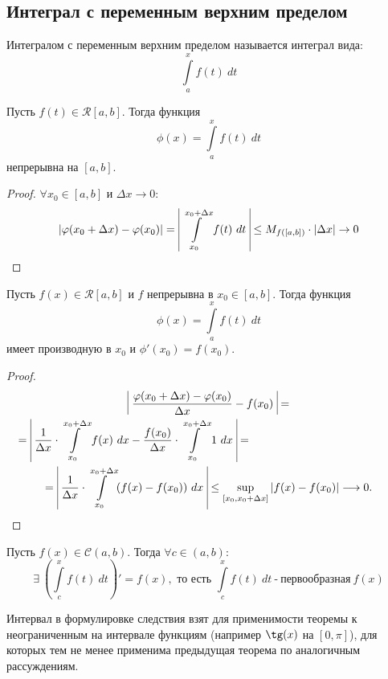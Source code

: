 \subsection{Интеграл с переменным верхним пределом}
\begin{definition}
    Интегралом с переменным верхним пределом называется интеграл вида:
    \[\int\limits_{a}^{x} f(t)\ dt\]
\end{definition} 
\begin{theorem}
    Пусть $f(t)\in \mathcal{R}[a, b]$. Тогда функция
    \[\phi(x) = \int\limits_{a}^{x} f(t)\ dt\]
    непрерывна на $[a, b]$.
\end{theorem}
\begin{proof} 
    $\forall x_0\in [a,b]$ и $\Delta x\to 0:$
    \[|\phi(x_0 + \Delta x) - \phi(x_0)| =\ \vline\int\limits_{x_0}^{x_0 + \Delta x} f(t)\ dt\ \vline \leq M_{f([a, b])}\cdot |\Delta x| \rightarrow 0\]
\end{proof}
\begin{theorem}
    Пусть $f(x)\in \mathcal{R}[a, b]$ и $f$ непрерывна в $x_0 \in [a, b]$. Тогда функция
    \[\phi(x) = \int\limits_{a}^{x} f(t)\ dt\]
    имеет производную в $x_0$ и $\phi'(x_0) = f(x_0)$.
\end{theorem}
\begin{proof}
    \begin{multline*}
        \vline\ \frac{\phi(x_0 + \Delta x) - \phi(x_0)}{\Delta x} - f(x_0)\ \vline =\\
        =\ \vline\frac{1}{\Delta x}\cdot \int\limits_{x_0}^{x_0 + \Delta x} f(x)\ dx - \frac{f(x_0)}{\Delta x} \cdot \int\limits_{x_0}^{x_0 + \Delta x} 1\ dx\ \vline =\tab[4.7cm]\\
        =\ \vline\frac{1}{\Delta x}\cdot \int\limits_{x_0}^{x_0 + \Delta x} (f(x) - f(x_0))\ dx\ \vline \leq \sup \limits_{[x_0, x_0+\Delta x]}|f(x) - f(x_0)| \longrightarrow 0.
    \end{multline*}
\end{proof}
\begin{consequense}
    Пусть $f(x) \in \mathcal{C}(a, b)$. Тогда $\forall c \in (a, b)$:
    \[\exists \ \left(\int\limits_{c}^{x} f(t)\ dt\right)' = f(x), \text{ то есть } \int\limits_{c}^{x} f(t)\ dt\ \text{-}\ \text{первообразная} \ f(x)\]
\end{consequense}
\begin{comm}
    Интервал в формулировке следствия взят для применимости теоремы к неограниченным на интервале функциям (например $\tg(x)$ на $[0, \pi]$), для которых тем не менее применима предыдущая теорема по аналогичным рассуждениям.
\end{comm}

